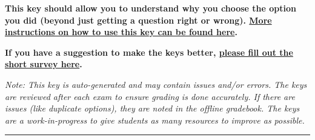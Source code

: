 \documentclass{extbook}[14pt]
\begin{document}
\textbf{This key should allow you to understand why you choose the option you did (beyond just getting a question right or wrong). \href{https://xronos.clas.ufl.edu/mac1105spring2020/courseDescriptionAndMisc/Exams/LearningFromResults}{More instructions on how to use this key can be found here}.}

\textbf{If you have a suggestion to make the keys better, \href{https://forms.gle/CZkbZmPbC9XALEE88}{please fill out the short survey here}.}

\textit{Note: This key is auto-generated and may contain issues and/or errors. The keys are reviewed after each exam to ensure grading is done accurately. If there are issues (like duplicate options), they are noted in the offline gradebook. The keys are a work-in-progress to give students as many resources to improve as possible.}

\rule{\textwidth}{0.4pt}
\end{document}
